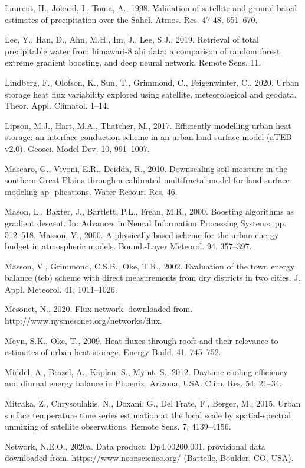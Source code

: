 \documentclass[3p,times]{elsarticle}
\begin{document}
Laurent, H., Jobard, I., Toma, A., 1998. Validation of satellite and ground-based estimates of precipitation over the Sahel. Atmos. Res. 47-48, 651–670.

Lee, Y., Han, D., Ahn, M.H., Im, J., Lee, S.J., 2019. Retrieval of total precipitable water from himawari-8 ahi data: a comparison of random forest, extreme gradient boosting, and deep neural network. Remote Sens. 11.

Lindberg, F., Olofson, K., Sun, T., Grimmond, C., Feigenwinter, C., 2020. Urban storage heat flux variability explored using satellite, meteorological and geodata. Theor. Appl. Climatol. 1–14.

Lipson, M.J., Hart, M.A., Thatcher, M., 2017. Efficiently modelling urban heat storage: an interface conduction scheme in an urban land surface model (aTEB v2.0). Geosci. Model Dev. 10, 991–1007.

Mascaro, G., Vivoni, E.R., Deidda, R., 2010. Downscaling soil moisture in the southern Great Plains through a calibrated multifractal model for land surface modeling ap- plications. Water Resour. Res. 46.

Mason, L., Baxter, J., Bartlett, P.L., Frean, M.R., 2000. Boosting algorithms as gradient descent. In: Advances in Neural Information Processing Systems, pp. 512–518. Masson, V., 2000. A physically-based scheme for the urban energy budget in atmospheric models. Bound.-Layer Meteorol. 94, 357–397.

Masson, V., Grimmond, C.S.B., Oke, T.R., 2002. Evaluation of the town energy balance (teb) scheme with direct measurements from dry districts in two cities. J. Appl. Meteorol. 41, 1011–1026.

Mesonet, N., 2020. Flux network. downloaded from. http://www.nysmesonet.org/networks/flux.

Meyn, S.K., Oke, T., 2009. Heat fluxes through roofs and their relevance to estimates of urban heat storage. Energy Build. 41, 745–752.

Middel, A., Brazel, A., Kaplan, S., Myint, S., 2012. Daytime cooling efficiency and diurnal energy balance in Phoenix, Arizona, USA. Clim. Res. 54, 21–34.

Mitraka, Z., Chrysoulakis, N., Doxani, G., Del Frate, F., Berger, M., 2015. Urban surface temperature time series estimation at the local scale by spatial-spectral unmixing of satellite observations. Remote Sens. 7, 4139–4156.

Network, N.E.O., 2020a. Data product: Dp4.00200.001. provisional data downloaded from. https://www.neonscience.org/ (Battelle, Boulder, CO, USA).
\end{document}
